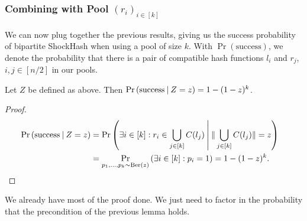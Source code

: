 \documentclass[a4paper,USenglish,cleveref]{lipics-v2021}
\def\cond{\hspace{0.8mm}\middle\vert\hspace{0.8mm}}
\begin{document}
\subsubsection{Combining with Pool \texorpdfstring{$(r_i)_{i\in[k]}$}{r}} \label{s:combining}
We can now plug together the previous results, giving us the success probability of bipartite ShockHash when using a pool of size $k$.
With $\Pr\left(\textrm{success}\right)$, we denote the probability that there is a pair of compatible hash functions $l_i$ and $r_j$, $i,j\in[n/2]$ in our pools.

\begin{lemma}
  Let $Z$ be defined as above.
  Then $\Pr\left(\textrm{success} \cond Z = z \right) = 1-(1-z)^k$.
  \label{lem:poolSuccessConditioned}
\end{lemma}
\begin{proof}
  \begin{align*}
    \Pr\left(\textrm{success} \cond Z = z\right)
      &= \Pr\left(\exists i \in [k] : r_i \in \bigcup_{j \in [k]} C(l_j) \cond \|\bigcup_{j \in [k]} C(l_j)\| = z\right)\\
      &= \Pr_{p_1,\ldots,p_k \sim \textrm{Ber}(z)}\left(\exists i \in [k] : p_i = 1\right)
      = 1-(1-z)^k.
    \tag*{\qedhere}
  \end{align*}
\end{proof}

We already have most of the proof done.
We just need to factor in the probability that the precondition of the previous lemma holds.
\end{document}
